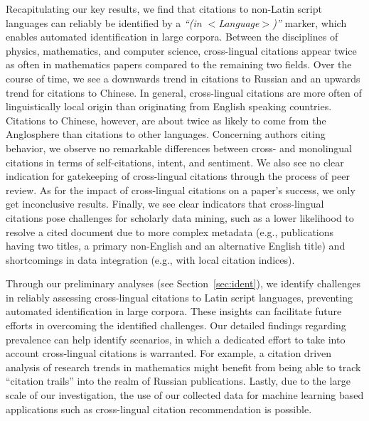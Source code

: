 Recapitulating our key results, we find that citations to non-Latin script languages can reliably be identified by a \textit{``(in $<$Language$>$)''} marker, which enables automated identification in large corpora. Between the disciplines of physics, mathematics, and computer science, cross-lingual citations appear twice as often in mathematics papers compared to the remaining two fields. Over the course of time, we see a downwards trend in citations to Russian and an upwards trend for citations to Chinese. In general, cross-lingual citations are more often of linguistically local origin than originating from English speaking countries. Citations to Chinese, however, are about twice as likely to come from the Anglosphere than citations to other languages. Concerning authors citing behavior, we observe no remarkable differences between cross- and monolingual citations in terms of self-citations, intent, and sentiment. We also see no clear indication for gatekeeping of cross-lingual citations through the process of peer review. As for the impact of cross-lingual citations on a paper's success, we only get inconclusive results. Finally, we see clear indicators that cross-lingual citations pose challenges for scholarly data mining, such as a lower likelihood to resolve a cited document due to more complex metadata (e.g., publications having two titles, a primary non-English and an alternative English title) and shortcomings in data integration (e.g., with local citation indices).

Through our preliminary analyses (see Section~\ref{sec:ident}), we identify challenges in reliably assessing cross-lingual citations to Latin script languages, preventing automated identification in large corpora. These insights can facilitate future efforts in overcoming the identified challenges. Our detailed findings regarding prevalence can help identify scenarios, in which a dedicated effort to take into account cross-lingual citations is warranted. For example, a citation driven analysis of research trends in mathematics might benefit from being able to track ``citation trails'' into the realm of Russian publications. Lastly, due to the large scale of our investigation, the use of our collected data for machine learning based applications such as cross-lingual citation recommendation is possible.

